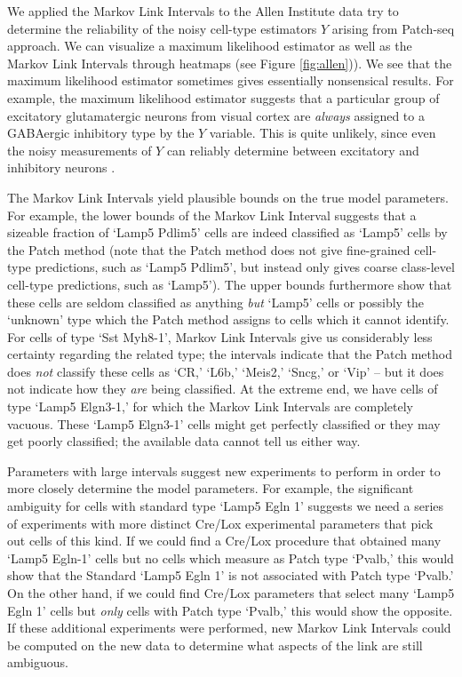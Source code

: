 \documentclass{article}
\theoremstyle{definition}
\begin{document}
We applied the Markov Link Intervals to the Allen Institute data try to determine the reliability of the noisy cell-type estimators $Y$ arising from Patch-seq approach.  We can visualize a maximum likelihood estimator as well as the Markov Link Intervals through heatmaps (see Figure \ref{fig:allen})).  We see that the maximum likelihood estimator sometimes gives essentially nonsensical results.  For example, the maximum likelihood estimator suggests that a particular group of excitatory glutamatergic neurons from visual cortex are \emph{always} assigned to a GABAergic inhibitory type by the $Y$ variable.  This is quite unlikely, since even the noisy measurements of $Y$ can reliably determine between excitatory and inhibitory neurons \cite{cadwell2016electrophysiological,cadwell2017multimodal}. 

The Markov Link Intervals yield plausible bounds on the true model parameters.  For example, the lower bounds of the Markov Link Interval suggests that a sizeable fraction of `Lamp5 Pdlim5' cells are indeed classified as `Lamp5' cells by the Patch method (note that the Patch method does not give fine-grained cell-type predictions, such as `Lamp5 Pdlim5', but instead only gives coarse class-level cell-type predictions, such as `Lamp5').  The upper bounds furthermore show that these cells are seldom classified as anything \emph{but} `Lamp5' cells or possibly the `unknown' type which the Patch method assigns to cells which it cannot identify.  For cells of type `Sst Myh8-1',  Markov Link Intervals give us considerably less certainty regarding the related type; the intervals indicate that the Patch method does \emph{not} classify these cells as `CR,' `L6b,' `Meis2,' `Sncg,' or `Vip' -- but it does not indicate  how they \emph{are} being classified.  At the extreme end, we have cells of type `Lamp5 Elgn3-1,' for which the Markov Link Intervals are completely vacuous.   These `Lamp5 Elgn3-1' cells might get perfectly classified or they may get poorly classified; the available data cannot tell us either way.  

Parameters with large intervals suggest new experiments to perform in order to more closely determine the model parameters.  For example, the significant ambiguity for cells with standard type `Lamp5 Egln 1' suggests we need a series of experiments with more distinct Cre/Lox experimental parameters that pick out cells of this kind.  If we could find a Cre/Lox procedure that obtained many `Lamp5 Egln-1' cells but no cells which measure as Patch type `Pvalb,' this would show that the Standard `Lamp5 Egln 1' is not associated with Patch type `Pvalb.'  On the other hand, if we could find Cre/Lox parameters that select many `Lamp5 Egln 1' cells but \emph{only} cells with Patch type `Pvalb,' this would show the opposite.  If these additional experiments were performed, new Markov Link Intervals could be computed on the new data to determine what aspects of the link are still ambiguous.  
\end{document}
